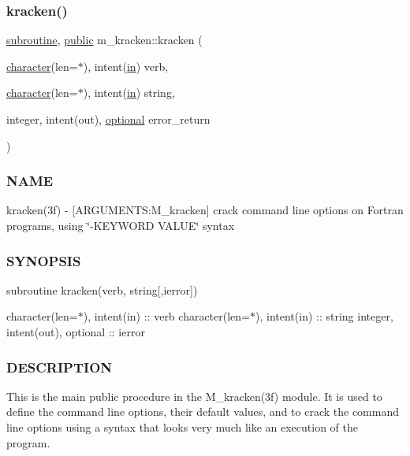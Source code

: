\subsubsection{\texorpdfstring{kracken()}{kracken()}}
{\footnotesize\ttfamily \hyperlink{M__stopwatch_83_8txt_acfbcff50169d691ff02d4a123ed70482}{subroutine}, \hyperlink{M__stopwatch_83_8txt_a2f74811300c361e53b430611a7d1769f}{public} m\+\_\+kracken\+::kracken (\begin{DoxyParamCaption}\item[{\hyperlink{option__stopwatch_83_8txt_abd4b21fbbd175834027b5224bfe97e66}{character}(len=$\ast$), intent(\hyperlink{M__journal_83_8txt_afce72651d1eed785a2132bee863b2f38}{in})}]{verb,  }\item[{\hyperlink{option__stopwatch_83_8txt_abd4b21fbbd175834027b5224bfe97e66}{character}(len=$\ast$), intent(\hyperlink{M__journal_83_8txt_afce72651d1eed785a2132bee863b2f38}{in})}]{string,  }\item[{integer, intent(out), \hyperlink{option__stopwatch_83_8txt_aa4ece75e7acf58a4843f70fe18c3ade5}{optional}}]{error\+\_\+return }\end{DoxyParamCaption})}



\subsubsection*{N\+A\+ME}

kracken(3f) -\/ \mbox{[}A\+R\+G\+U\+M\+E\+N\+TS\+:M\+\_\+kracken\mbox{]} crack command line options on Fortran programs, using \char`\"{}-\/\+K\+E\+Y\+W\+O\+R\+D V\+A\+L\+U\+E\char`\"{} syntax \subsubsection*{S\+Y\+N\+O\+P\+S\+IS}

subroutine kracken(verb, string\mbox{[},ierror\mbox{]})

character(len=$\ast$), intent(in) \+:\+: verb character(len=$\ast$), intent(in) \+:\+: string integer, intent(out), optional \+:\+: ierror

\subsubsection*{D\+E\+S\+C\+R\+I\+P\+T\+I\+ON}

\begin{DoxyVerb} This is the main public procedure in the M_kracken(3f) module.
 It is used to define the command line options, their default
 values, and to crack the command line options using a syntax
 that looks very much like an execution of the program.
\end{DoxyVerb}



